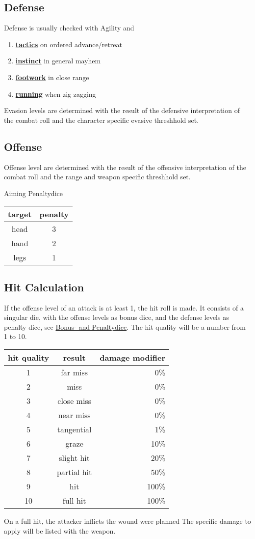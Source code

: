 \subsection{Defense}\label{subsec:defense}
Defense is usually checked with Agility and
\begin{enumerate}[label = - ]
    \item \hyperref[subsec:tactics]{\textbf{tactics}} on ordered advance/retreat
    \item \hyperref[subsec:instinct]{\textbf{instinct}} in general mayhem
    \item \hyperref[subsec:footwork]{\textbf{footwork}} in close range
    \item \hyperref[subsec:running]{\textbf{running}} when zig zagging
\end{enumerate}
Evasion levels are determined with the result of the defensive interpretation of the combat roll
and the character specific evasive threshhold set.

\subsection{Offense}\label{subsec:offense}
Offense level are determined with the result of the offensive \-interpretation of the combat roll \-and the range and
weapon \-specific threshhold set.\par
Aiming Penaltydice
\begin{tabular}{cc}
    target & penalty\\\hline
    head & 3 \\
    hand & 2 \\
    legs & 1 \\
\end{tabular}
\subsection{Hit Calculation}\label{subsec:hit}
If the offense level of an attack is at least 1, the hit roll is made.
It consists of a singular die, with the offense levels as bonus dice, and the defense levels as penalty dice,
see \hyperref[sec:bonus--and-penaltydice]{Bonus- and Penaltydice}.
The hit quality will be a number from 1 to 10. \par
\begin{tabular}{c|cr}
    hit quality & result & damage modifier \\\hline
    1 & far miss & 0\%\\
    2 & miss& 0\%\\
    3 & close miss& 0\%\\
    4 & near miss& 0\%\\
    5 & tangential& 1\%\\
    6 & graze& 10\%\\
    7 & slight hit& 20\%\\
    8 & partial hit& 50\%\\
    9 & hit& 100\%\\
    10 & full hit& 100\%\\
\end{tabular}

On a full hit, the attacker inflicts the wound were planned
The specific damage to apply will be listed with the weapon.
